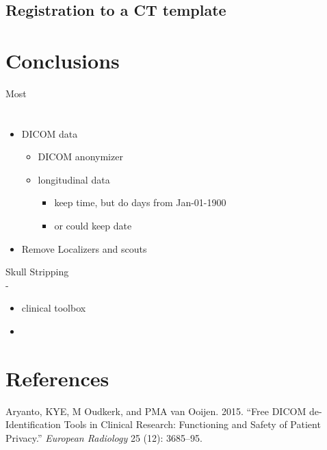 \documentclass[]{elsarticle} %
\providecommand{\tightlist}{%
  \setlength{\itemsep}{0pt}\setlength{\parskip}{0pt}}
\begin{document}
\hypertarget{registration-to-a-ct-template}{%
\subsection{Registration to a CT
template}\label{registration-to-a-ct-template}}

\hypertarget{conclusions}{%
\section{Conclusions}\label{conclusions}}

Most

\hypertarget{section}{%
\section{}\label{section}}

\begin{itemize}
\tightlist
\item
  DICOM data

  \begin{itemize}
  \tightlist
  \item
    DICOM anonymizer
  \item
    longitudinal data

    \begin{itemize}
    \tightlist
    \item
      keep time, but do days from Jan-01-1900
    \item
      or could keep date
    \end{itemize}
  \end{itemize}
\item
  Remove Localizers and scouts
\end{itemize}

Skull Stripping\\
-

\begin{itemize}
\item
  clinical toolbox
\item
\end{itemize}

\hypertarget{references}{%
\section*{References}\label{references}}

\hypertarget{refs}{}
\leavevmode\hypertarget{ref-aryanto2015free}{}%
Aryanto, KYE, M Oudkerk, and PMA van Ooijen. 2015. ``Free DICOM
de-Identification Tools in Clinical Research: Functioning and Safety of
Patient Privacy.'' \emph{European Radiology} 25 (12): 3685--95.
\end{document}
